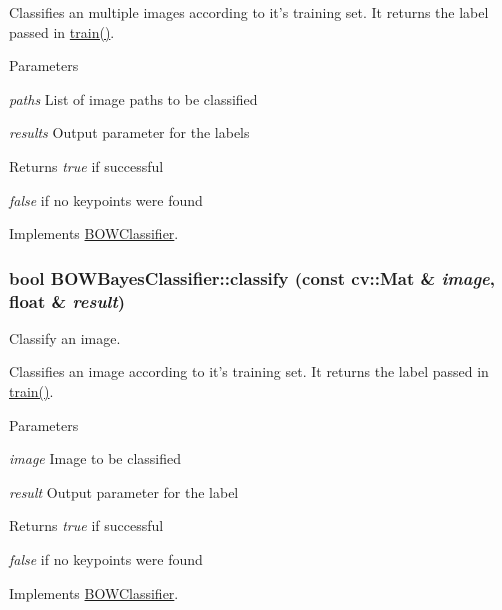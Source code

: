 Classifies an multiple images according to it's training set. It returns the label passed in \hyperlink{classBOWBayesClassifier_a66e43076ec168747b903705ea2448939}{train()}.


\begin{DoxyParams}{Parameters}
\item[{\em paths}]List of image paths to be classified \item[{\em results}]Output parameter for the labels \end{DoxyParams}
\begin{DoxyReturn}{Returns}
{\itshape true\/} if successful\par
 {\itshape false\/} if no keypoints were found 
\end{DoxyReturn}


Implements \hyperlink{classBOWClassifier_a0785d39115372051816210d8d2c0335e}{BOWClassifier}.

\hypertarget{classBOWBayesClassifier_a360c377b335ad194f73c1659795afef5}{
\subsubsection[{classify}]{\setlength{\rightskip}{0pt plus 5cm}bool BOWBayesClassifier::classify (const cv::Mat \& {\em image}, \/  float \& {\em result})}}
\label{classBOWBayesClassifier_a360c377b335ad194f73c1659795afef5}


Classify an image. 

Classifies an image according to it's training set. It returns the label passed in \hyperlink{classBOWBayesClassifier_a66e43076ec168747b903705ea2448939}{train()}.


\begin{DoxyParams}{Parameters}
\item[{\em image}]Image to be classified \item[{\em result}]Output parameter for the label \end{DoxyParams}
\begin{DoxyReturn}{Returns}
{\itshape true\/} if successful\par
 {\itshape false\/} if no keypoints were found 
\end{DoxyReturn}


Implements \hyperlink{classBOWClassifier_a63bff22f5005e1b79d9c4cd5e7a57748}{BOWClassifier}.

